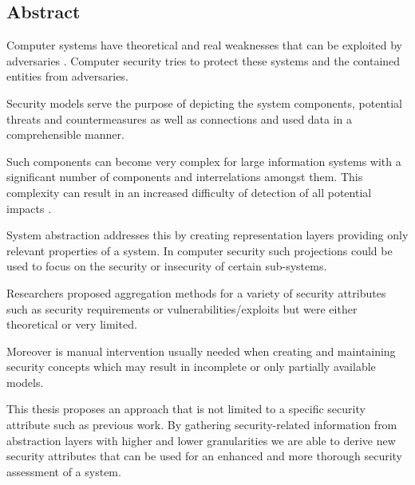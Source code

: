 \subsection*{Abstract}
\pagestyle{empty}

Computer systems have theoretical and real weaknesses that can be exploited by adversaries \cite{Pfleeger:2006:SC:1177321}. Computer security tries to protect these systems and the contained entities from adversaries.

Security models serve the purpose of depicting the system components, potential threats and countermeasures as well as connections and used data in a comprehensible manner. 

Such components can become very complex for large information systems with a significant number of components and interrelations amongst them. This complexity can result in an increased difficulty of detection of all potential impacts \cite{branagan}.

System abstraction addresses this by creating representation layers providing only relevant properties of a system. In computer security such projections could be used to focus on the security or insecurity of certain sub-systems.

Researchers proposed aggregation methods for a variety of security attributes such as security requirements \cite{Menzel2008} or vulnerabilities/exploits \cite{Noel:2004:MAG:1029208.1029225} but were either theoretical or very limited. 

Moreover is manual intervention usually needed  when creating and maintaining security concepts  which may result in incomplete or only partially available models.

This thesis proposes an approach that is not limited to a specific security attribute such as previous work. By gathering security-related information from abstraction layers with higher and lower granularities we are able to derive new security attributes that can be used for an enhanced and more thorough security assessment of a system.
